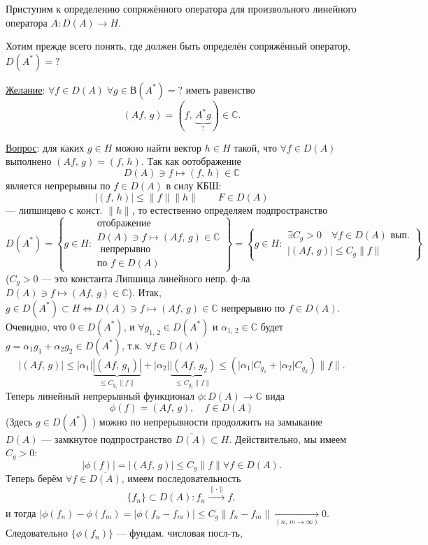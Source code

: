 Приступим к определению сопряжённого оператора для произвольного
линейного оператора
$A : D(A) \to H$.

Хотим прежде всего понять, где должен быть определён сопряжённый
оператор, \underline{$D(A^*)=?$}

\underline{Желание}: $\forall f \in  D(A) \; \forall g \in 
В(A^*)=?$ иметь равенство 
 \[
	 \left( Af,\,g \right) =\left(f,\,\underbrace{A^*g}_{?}\right) \in \mathbb{C}
 .\] 

 \underline{Вопрос}: для каких $g \in  H$ можно найти вектор
 $h \in H$ такой, что $\forall f \in  D(A)$ выполнено
 $\left( Af,\,g \right) =(f,\,h)$. Так как оотображение
\[
	D(A) \ni f \mapsto (f,\,h) \in \mathbb{C}
\]
является непрерывны по $f \in  D(A)$ в силу КБШ:
\[
	|(f,\,h)|\le \| f\| \| h\| \qquad F \in D(A)
\]
--- липшицево с конст. $\| h\|$,
то естественно определяем подпространство
\[
	D(A^*) = \left\{  g \in H :
\substack{ \text{отображение } \\ 
D(A) \ni f \mapsto (Af,\,g) \in \mathbb{C}\\
\text{ непрерывно}\\ \text{по } f \in D(A)}\right\} 
=
\left\{ g \in H:
\substack{\exists C_g > 0 \quad \forall f \in D(A) \text{ вып.}\\
|(Af,\,g)|\le C_g \| f\|}\right\} 
\]
($C_g>0$ --- это константа Липшица линейного непр. ф-ла
$D(A) \ni f \mapsto (Af,\,g) \in \mathbb{C}$).
Итак, $g \in  D(A^*)\subset H \Leftrightarrow
 D(A) \ni f \mapsto  (Af,\,g) \in \mathbb{C}$ непрерывно по 
$f \in D(A)$. Очевидно, что $0 \in D(A^*)$, и 
$\forall g_{1,\,2} \in  D(A^*)$ и $\alpha_{1,\,2} \in \mathbb{C}$ 
будет $g=\alpha_1 g_1 + \alpha_2 g_2 \in D(A^*)$, т.\:к.
$\forall f \in D(A)$ 
\[
	|(Af,\,g)|\le |\alpha_1|
	\underbrace{|(Af,\,g_1)|}_{\le C_{g_1}\| f\|}+
	|\alpha_2| \underbrace{|(Af,\,g_2)}_{\le C_{g_2}\| f\|}\le 
	(|\alpha_1| C_{g_1}+ |\alpha_2| C_{g_2}) \| f\|
.\] 
Теперь линейный непрерывный функционал $\phi : D(A) \to \mathbb{C}$ 
вида 
\[
	\phi(f) =(Af,\,g), \quad f \in D(A)
\]
(Здесь $g \in D(A^*)$ ) можно по непрерывности продолжить на
замыкание $D(A)$ --- замкнутое подпространство $\overline{D(A)}
 \subset H$. Действительно, мы имеем $C_g>0$:
 \[
	 |\phi(f)|= |(Af,\,g)|\le 
	 C_g \| f\| \forall f \in D(A)
 .\] 
 Теперь берём $\forall f \in \overline{D(A)}$, имеем последовательность
 \[
	 \{f_n\} \subset D(A): f_n \xrightarrow[]{\| \cdot\|}f,
\]
и тогда $|\phi(f_n) -\phi(f_m)=|\phi(f_n -f_m)|\le 
 C_g \| f_n -f_m\|\xrightarrow[(n,\,m\to \infty)]{} 0$.
Следовательно $\{\phi(f_n)\} $ --- фундам. числовая посл-ть,

